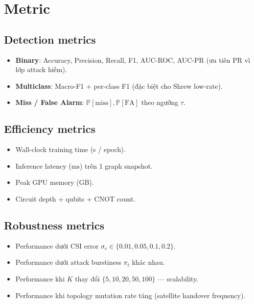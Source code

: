 \documentclass[11pt,a4paper]{article}
\begin{document}
\section{Metric}

\subsection{Detection metrics}
\begin{itemize}
  \item \textbf{Binary}: Accuracy, Precision, Recall, F1, AUC-ROC, AUC-PR (ưu tiên PR vì lớp attack hiếm).
  \item \textbf{Multiclass}: Macro-F1 + per-class F1 (đặc biệt cho Shrew low-rate).
  \item \textbf{Miss / False Alarm}: $\mathbb{P}[\mathrm{miss}], \mathbb{P}[\mathrm{FA}]$ theo ngưỡng $\tau$.
\end{itemize}

\subsection{Efficiency metrics}
\begin{itemize}
  \item Wall-clock training time (s / epoch).
  \item Inference latency (ms) trên 1 graph snapshot.
  \item Peak GPU memory (GB).
  \item Circuit depth + qubits + CNOT count.
\end{itemize}

\subsection{Robustness metrics}
\begin{itemize}
  \item Performance dưới CSI error $\sigma_e \in \{0.01, 0.05, 0.1, 0.2\}$.
  \item Performance dưới attack burstiness $\pi_t$ khác nhau.
  \item Performance khi $K$ thay đổi $\{5, 10, 20, 50, 100\}$ --- scalability.
  \item Performance khi topology mutation rate tăng (satellite handover frequency).
\end{itemize}
\end{document}
